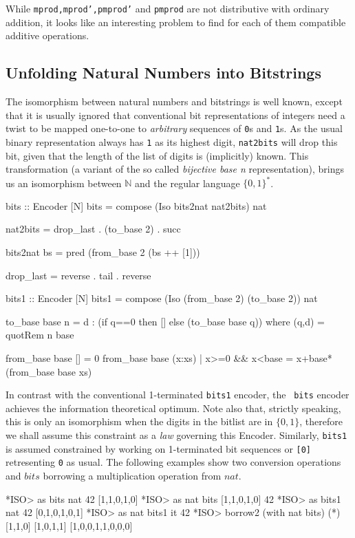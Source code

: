 \documentclass[]{INCLUDES/llncs}
\begin{document}
While {\tt mprod,mprod',pmprod'} and {\tt pmprod} are not distributive with
ordinary addition, it looks like an interesting problem to find for each of
them compatible additive operations.

\subsection{Unfolding Natural Numbers into Bitstrings} \label{bits}
The isomorphism between natural numbers and bitstrings is well known, except
that it is usually ignored that conventional bit representations
of integers need a twist to be mapped one-to-one to
{\em arbitrary} sequences of {\tt 0}s and {\tt 1}s.
As the usual binary representation always has
{\tt 1} as its highest digit, {\tt nat2bits}
will drop this bit, given
that the length of the list of digits is 
(implicitly) known. This transformation (a variant of the so called {\em
bijective base n} representation), brings us an isomorphism between $\mathbb{N}$ and
the regular language $\{0,1\}^*$.
\begin{code}
bits :: Encoder [N]
bits = compose (Iso bits2nat nat2bits) nat

nat2bits = drop_last . (to_base 2) . succ

bits2nat bs = pred (from_base 2 (bs ++ [1]))

drop_last =
    reverse . tail . reverse

bits1 :: Encoder [N]
bits1 = compose (Iso (from_base 2) (to_base 2)) nat

to_base base n = d : 
  (if q==0 then [] else (to_base base q)) where
     (q,d) = quotRem n base
    
from_base base [] = 0
from_base base (x:xs) | x>=0 && x<base = 
   x+base*(from_base base xs)
\end{code}
In contrast with the conventional 1-terminated {\tt bits1} encoder, the {\tt
bits} encoder achieves the information theoretical optimum. Note also that,
strictly speaking, this is only an isomorphism when the digits in the bitlist are in $\{0,1\}$,
therefore we shall assume this constraint
as a {\em law} governing this Encoder. Similarly, {\tt bits1} is assumed
constrained by working on 1-terminated bit sequences or {\tt [0]} retresenting
{\tt 0} as usual. The following examples show two conversion operations and
$bits$ borrowing a multiplication operation from $nat$.
\begin{codex}
*ISO> as bits nat 42
[1,1,0,1,0]
*ISO> as nat bits [1,1,0,1,0]
42
*ISO> as bits1 nat 42
[0,1,0,1,0,1]
*ISO> as nat bits1 it
42
*ISO> borrow2 (with nat bits) (*) [1,1,0] [1,0,1,1]
[1,0,0,1,1,0,0,0]
\end{codex}
\end{document}
